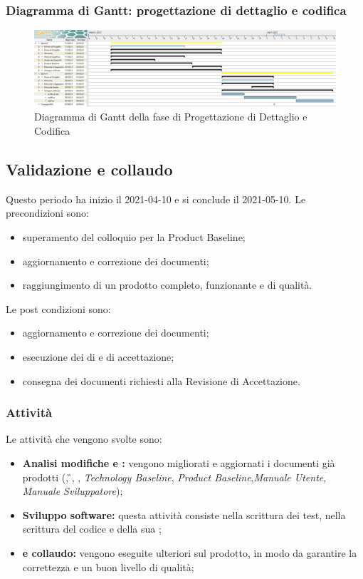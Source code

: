 \subsubsection{Diagramma di Gantt: progettazione di dettaglio e codifica}
\begin{figure}[H]
    \centering
    \includegraphics[scale = 0.33]{components/img/progettazione_dettaglio_codifica.png}
    \caption{Diagramma di Gantt della fase di Progettazione di Dettaglio e Codifica}
    \label{fig:Diagramma di Gantt, fase di Progettazione di dettaglio e codifica}
\end{figure}

\newpage
\subsection{Validazione e collaudo}
Questo periodo ha inizio il 2021-04-10 e si conclude il 2021-05-10.
Le precondizioni sono:
\begin{itemize}
	\item superamento del colloquio per la Product Baseline;
	\item aggiornamento e correzione dei documenti;
	\item raggiungimento di un prodotto completo, funzionante e di qualità.
\end{itemize}
Le post condizioni sono:
\begin{itemize}
	\item aggiornamento e correzione dei documenti;
	\item esecuzione dei  di  e di accettazione;
	\item consegna dei documenti richiesti alla Revisione di Accettazione.
\end{itemize}
\subsubsection{Attività}
Le attività che vengono svolte sono:
\begin{itemize}
	\item \textbf{Analisi modifiche e :} vengono migliorati e aggiornati i documenti già prodotti (\PdP{}, \G{}, \PdQ{}, \textit{Technology Baseline}, \textit{Product Baseline},\textit{Manuale Utente}, \textit{Manuale Sviluppatore});
	\item \textbf{Sviluppo software:} questa attività consiste nella scrittura dei test, nella scrittura del codice e della sua ;
	\item \textbf{ e collaudo:} vengono eseguite ulteriori  sul prodotto, in modo da garantire la correttezza e un buon livello di qualità;
\end{itemize}

